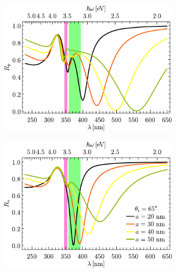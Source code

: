 \begin{figure}[h!]
	\hspace*{-1.5em}
	\begin{subfigure}{.01\linewidth}\caption{}\label{sfig:Ag-cutp-Rad}\vspace{4.5cm}\end{subfigure}
	\begin{subfigure}{.45\linewidth}\hspace*{-1.5em}
	\includegraphics[scale=1]{2-Resultados/figs/9-AgrVar/cut_angle_65_p.pdf}\end{subfigure}
	\begin{subfigure}{.01\linewidth}\caption{}\label{sfig:Ag-cuts-Rad}\vspace{4.5cm}\end{subfigure}\hspace*{-1.em}
	\begin{subfigure}{.45\linewidth}\centering
	\includegraphics[scale=1 ]{2-Resultados/figs/9-AgrVar/cut_angle_65_s.pdf}\end{subfigure}\vspace*{-.5em}

\end{figure}

